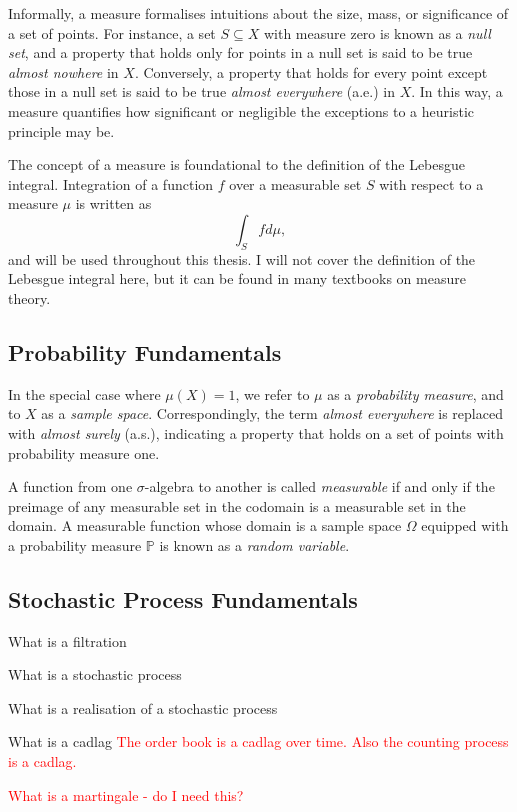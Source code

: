 \documentclass[honours,12pt]{unswthesis}
\numberwithin{equation}{section}
\begin{document}
Informally, a measure formalises intuitions about the size, mass, or significance of a set of points. For instance, a set $S\subseteq X$ with measure zero is known as a \textit{null set}, and a property that holds only for points in a null set is said to be true \textit{almost nowhere} in $X$. Conversely, a property that holds for every point except those in a null set is said to be true \textit{almost everywhere} (a.e.) in $X$. In this way, a measure quantifies how significant or negligible the exceptions to a heuristic principle may be.

The concept of a measure is foundational to the definition of the Lebesgue integral. Integration of a function $f$ over a measurable set $S$ with respect to a measure $\mu$ is written as
$$\int_S f d\mu,$$
and will be used throughout this thesis. I will not cover the definition of the Lebesgue integral here, but it can be found in many textbooks on measure theory.

\subsection{Probability Fundamentals}

In the special case where $\mu(X)=1$, we refer to $\mu$ as a \textit{probability measure}, and to $X$ as a \textit{sample space}. Correspondingly, the term \textit{almost everywhere} is replaced with \textit{almost surely} (a.s.), indicating a property that holds on a set of points with probability measure one.

A function from one $\sigma$-algebra to another is called \textit{measurable} if and only if the preimage of any measurable set in the codomain is a measurable set in the domain. A measurable function whose domain is a sample space $\Omega$ equipped with a probability measure $\mathbb{P}$ is known as a \textit{random variable}.

\subsection{Stochastic Process Fundamentals}

What is a filtration

What is a stochastic process

What is a realisation of a stochastic process

What is a cadlag \textcolor{red}{The order book is a cadlag over time. Also the counting process is a cadlag.}

\textcolor{red}{What is a martingale - do I need this?}
\end{document}
